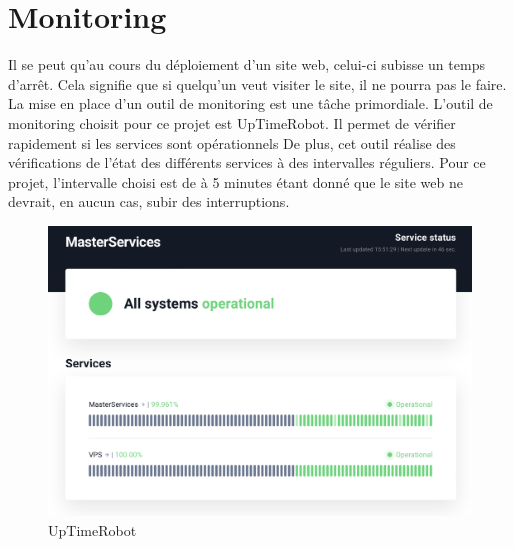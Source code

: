 \section{Monitoring}
Il se peut qu'au cours du déploiement d'un site web, celui-ci subisse un temps d'arrêt. Cela signifie que si quelqu'un veut visiter le site, il ne pourra pas le faire. La mise en place d'un outil de monitoring est une tâche primordiale. 
L'outil de monitoring choisit pour ce projet est UpTimeRobot. Il permet de vérifier rapidement si les services sont opérationnels
De plus, cet outil réalise des vérifications de l'état des différents services à des intervalles réguliers. Pour ce projet, l'intervalle choisi est de à 5 minutes étant donné que le site web ne devrait, en aucun cas, subir des interruptions.

\begin{figure}[H]
    \centering
    \includegraphics[width=\linewidth]{img/uptime.png}
    \caption{UpTimeRobot}
    \label{UpTimeRobot}
\end{figure}
